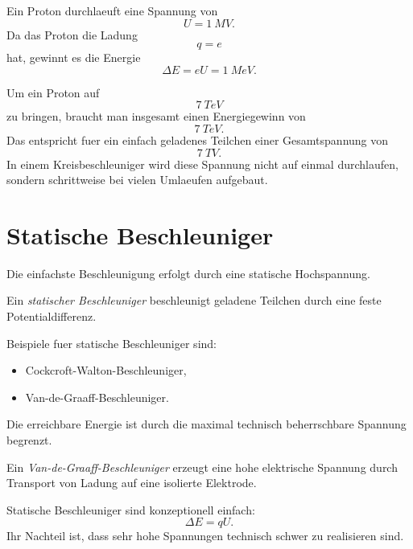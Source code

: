 \begin{examplebox}
Ein Proton durchlaeuft eine Spannung von
\[
    U=\SI{1}{MV}.
\]
Da das Proton die Ladung
\[
    q=e
\]
hat, gewinnt es die Energie
\[
    \Delta E=eU=\SI{1}{MeV}.
\]
\end{examplebox}

\begin{conceptbox}
Um ein Proton auf
\[
    \SI{7}{TeV}
\]
zu bringen, braucht man insgesamt einen Energiegewinn von
\[
    \SI{7}{TeV}.
\]
Das entspricht fuer ein einfach geladenes Teilchen einer Gesamtspannung von
\[
    \SI{7}{TV}.
\]
In einem Kreisbeschleuniger wird diese Spannung nicht auf einmal durchlaufen,
sondern schrittweise bei vielen Umlaeufen aufgebaut.
\end{conceptbox}

\section{Statische Beschleuniger}

Die einfachste Beschleunigung erfolgt durch eine statische Hochspannung.

\begin{definitionbox}
Ein \emph{statischer Beschleuniger} beschleunigt geladene Teilchen durch eine feste
Potentialdifferenz.
\end{definitionbox}

\begin{conceptbox}
Beispiele fuer statische Beschleuniger sind:
\begin{itemize}
    \item Cockcroft-Walton-Beschleuniger,
    \item Van-de-Graaff-Beschleuniger.
\end{itemize}

Die erreichbare Energie ist durch die maximal technisch beherrschbare Spannung
begrenzt.
\end{conceptbox}

\begin{definitionbox}
Ein \emph{Van-de-Graaff-Beschleuniger} erzeugt eine hohe elektrische Spannung durch
Transport von Ladung auf eine isolierte Elektrode.
\end{definitionbox}

\begin{examtipbox}
Statische Beschleuniger sind konzeptionell einfach:
\[
    \Delta E=qU.
\]
Ihr Nachteil ist, dass sehr hohe Spannungen technisch schwer zu realisieren sind.
\end{examtipbox}

